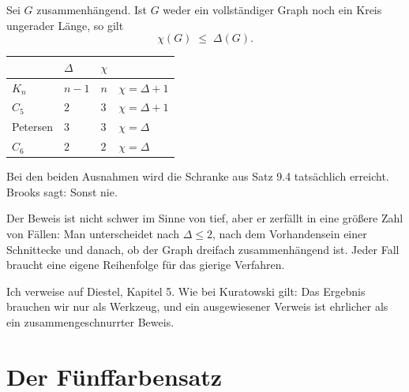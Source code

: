 \begin{merksatz}
Sei $G$ zusammenhängend. Ist $G$ weder ein vollständiger Graph noch ein Kreis ungerader Länge, so gilt
\[ \chi(G) \;\le\; \Delta(G) . \]

\begin{center}
\renewcommand{\arraystretch}{1.45}
\begin{tabular}{@{}P{2.2cm}P{1.6cm}P{1.6cm}P{2.4cm}@{}}
\toprule
& $\Delta$ & $\chi$ & \\
\midrule
$K_n$ & $n-1$ & $n$ & \textcolor{akzent}{$\chi = \Delta+1$}\\
$C_5$ & $2$ & $3$ & \textcolor{akzent}{$\chi = \Delta+1$}\\
Petersen & $3$ & $3$ & \textcolor{gruen}{$\chi = \Delta$}\\
$C_6$ & $2$ & $2$ & \textcolor{gruen}{$\chi = \Delta$}\\
\bottomrule
\end{tabular}
\end{center}

Bei den beiden Ausnahmen wird die Schranke aus Satz 9.4 tatsächlich erreicht. Brooks sagt: Sonst nie.
\end{merksatz}

\begin{warnung}
Der Beweis ist nicht schwer im Sinne von tief, aber er zerfällt in eine größere Zahl von Fällen: Man unterscheidet nach $\Delta \le 2$, nach dem Vorhandensein einer Schnittecke und danach, ob der Graph dreifach zusammenhängend ist. Jeder Fall braucht eine eigene Reihenfolge für das gierige Verfahren.

Ich verweise auf Diestel, Kapitel 5. Wie bei Kuratowski gilt: Das Ergebnis brauchen wir nur als Werkzeug, und ein ausgewiesener Verweis ist ehrlicher als ein zusammengeschnurrter Beweis.

\begin{center}
\begin{minipage}{0.88\textwidth}
\end{minipage}
\end{center}
\end{warnung}

\section{Der Fünffarbensatz}

